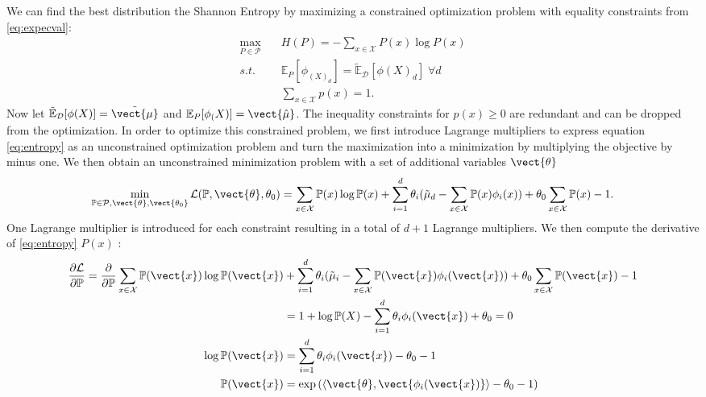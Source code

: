     We can find the best distribution \wrt the Shannon Entropy by maximizing a constrained optimization problem with equality constraints from \autoref{eq:expecval}:
    \begin{equation}
        \label{eq:entropy}
        \begin{split}
            \max_{P\in \mathcal{P}} \quad & H(P) = - \sum_{x\in\mathcal{X}} P(x) \log P(x) \\
            s.t. \quad & \mathbb{E}_P[\phi_(X)_d] = \tilde{\mathbb{E}}_{\mathcal{D}}[\phi(X)_d]  \; \forall d\\
            & \sum_{x\in \mathcal{X}} p(x) = 1.
        \end{split}
    \end{equation}
    Now let $\tilde{\mathbb{E}}_{\mathcal{D}}[\phi(X)] = \tilde{\vect{\mu}}$ and $\mathbb{E}_P[\phi_(X)] = \vect{\hat{\mu}}$.
    The inequality constraints for  $p(x) \geq 0$ are redundant and can be dropped from the optimization.
    In order to optimize this constrained problem, we first introduce Lagrange multipliers to express equation \autoref{eq:entropy} as an unconstrained optimization problem and turn the maximization into a minimization by multiplying the objective by minus one.
    We then obtain an unconstrained minimization problem with a set of additional variables $\vect{\theta}$
    \begin{equation}
        \min_{\mathbb{P}\in \mathcal{P}, \vect{\theta}, \vect{\theta_0} } \mathcal{L}(\mathbb{P}, \vect{\theta}, \theta_0) = \sum_{x\in\mathcal{X}} \mathbb{P}(x) \log \mathbb{P}(x) + \sum_{i=1}^d \theta_i (\tilde{\mu}_d - \sum_{x \in \mathcal{X}} \mathbb{P}(x) \phi_i(x)) + \theta_0 \sum_{x\in\mathcal{X}} \mathbb{P}(x) -1.
    \end{equation}
    One Lagrange multiplier is introduced for each constraint resulting in a total of $d+1$ Lagrange multipliers.
    We then compute the derivative of \autoref{eq:entropy} \wrt $P(x)$ :
    \begin{equation}
        \begin{split}
        \frac{\partial \mathcal{L}}{\partial \mathbb{P}} =  \frac{\partial}{\partial \mathbb{P}} \sum_{x\in\mathcal{X}} \mathbb{P}(\vect{x}) \log \mathbb{P}(\vect{x}) &+ \sum_{i=1}^d \theta_i (\tilde{\mu}_i - \sum_{x \in \mathcal{X}} \mathbb{P}(\vect{x}) \phi_i(\vect{x})) + \theta_0 \sum_{x\in\mathcal{X}} \mathbb{P}(\vect{x}) -1 \\ 
        &= 1 + \log \mathbb{P}(X) - \sum_{i=1}^d \theta_i  \phi_i(\vect{x}) + \theta_0 = 0 \\
        \log \mathbb{P}(\vect{x}) &=  \sum_{i=1}^d \theta_i  \phi_i(\vect{x}) - \theta_0 - 1 \\
        \mathbb{P}(\vect{x}) &= \exp{(\langle\vect{\theta}, \vect{\phi_i(\vect{x})} \rangle - \theta_0 - 1)} \\
    \end{split}
    \end{equation}

